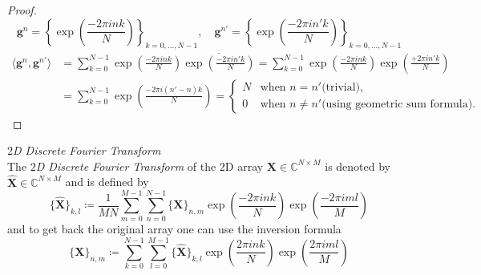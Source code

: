 \begin{proof}
    \begin{equation*}
        \boldsymbol{g}^n = \left\{\exp\left({\frac{-2\pi ink}{N}}\right)\right\}_{k=0,\ldots,N-1}, \quad \boldsymbol{g}^{n'} = \left\{\exp\left({\frac{-2\pi in'k}{N}}\right)\right\}_{k=0,\ldots,N-1}
    \end{equation*}
    \begin{align*} 
        \langle\boldsymbol{g}^n,\boldsymbol{g}^{n'}\rangle &= \sum_{k=0}^{N-1} \exp\left({\frac{-2\pi ink}{N}}\right)\overline{\exp\left({\frac{-2\pi in'k}{N}}\right)}
        = \sum_{k=0}^{N-1} \exp\left({\frac{-2\pi ink}{N}}\right)\exp\left({\frac{+2\pi in'k}{N}}\right)\\
        &= \sum_{k=0}^{N-1} \exp\left({\frac{-2\pi i(n'-n)k}{N}}\right)=
        \begin{cases}
            N & \text{when $n = n'$}\text{(trivial)},\\
            0 & \text{when $n\neq n'$}\text{(using geometric sum formula)}.
        \end{cases}
    \end{align*}
    
\end{proof}








\begin{Def}\label{def:2ddft}
    \emph{$2$D Discrete Fourier Transform}\\
    The \emph{$2$D Discrete Fourier Transform} of the $2$D array $\boldsymbol{X} \in \mathbb{C}^{N \times M}$ is denoted by 
    $\hat {\boldsymbol{X}} \in \mathbb{C}^{N \times M}$ and is defined by
    \begin{equation}\label{eq:2ddft}
        \{\hat {\boldsymbol{X}}\}_{k,l} \coloneq \frac{1}{MN}\sum_{m=0}^{M-1}\sum_{n=0}^{N-1} \{{\boldsymbol{X}}\}_{n,m}\exp\left({\frac{-2\pi ink}{N}}\right)\exp\left({\frac{-2\pi iml}{M}}\right)
    \end{equation}
    and to get back the original array one can use the inversion formula
    \begin{equation}\label{eq:2didft}
        \{{\boldsymbol{X}}\}_{n,m} \coloneq \sum_{k=0}^{N-1}\sum_{l=0}^{M-1}\{\hat {\boldsymbol{X}}\}_{k,l}\exp\left({\frac{2\pi ink}{N}}\right)\exp\left({\frac{2\pi iml}{M}}\right)
    \end{equation}    
\end{Def}

